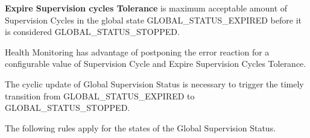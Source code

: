 {\bfseries Expire Supervision cycles Tolerance} is maximum acceptable amount of Supervision Cycles in the global state G\+L\+O\+B\+A\+L\+\_\+\+S\+T\+A\+T\+U\+S\+\_\+\+E\+X\+P\+I\+R\+ED before it is considered G\+L\+O\+B\+A\+L\+\_\+\+S\+T\+A\+T\+U\+S\+\_\+\+S\+T\+O\+P\+P\+ED.


\begin{DoxyItemize}
\item Health Monitoring has advantage of postponing the error reaction for a configurable value of Supervision Cycle and Expire Supervision Cycles Tolerance.
\item The cyclic update of Global Supervision Status is necessary to trigger the timely transition from G\+L\+O\+B\+A\+L\+\_\+\+S\+T\+A\+T\+U\+S\+\_\+\+E\+X\+P\+I\+R\+ED to G\+L\+O\+B\+A\+L\+\_\+\+S\+T\+A\+T\+U\+S\+\_\+\+S\+T\+O\+P\+P\+ED.
\end{DoxyItemize}

The following rules apply for the states of the Global Supervision Status.

